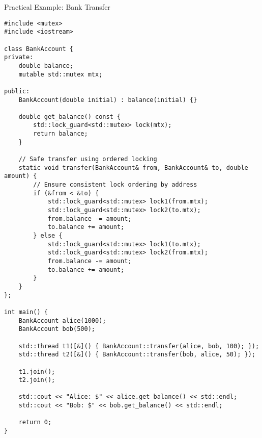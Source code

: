 \begin{frame}[fragile]{ Practical Example: Bank Transfer}
	\begin{verbatim}
#include <mutex>
#include <iostream>

class BankAccount {
private:
    double balance;
    mutable std::mutex mtx;

public:
    BankAccount(double initial) : balance(initial) {}

    double get_balance() const {
        std::lock_guard<std::mutex> lock(mtx);
        return balance;
    }

    // Safe transfer using ordered locking
    static void transfer(BankAccount& from, BankAccount& to, double amount) {
        // Ensure consistent lock ordering by address
        if (&from < &to) {
            std::lock_guard<std::mutex> lock1(from.mtx);
            std::lock_guard<std::mutex> lock2(to.mtx);
            from.balance -= amount;
            to.balance += amount;
        } else {
            std::lock_guard<std::mutex> lock1(to.mtx);
            std::lock_guard<std::mutex> lock2(from.mtx);
            from.balance -= amount;
            to.balance += amount;
        }
    }
};

int main() {
    BankAccount alice(1000);
    BankAccount bob(500);

    std::thread t1([&]() { BankAccount::transfer(alice, bob, 100); });
    std::thread t2([&]() { BankAccount::transfer(bob, alice, 50); });

    t1.join();
    t2.join();

    std::cout << "Alice: $" << alice.get_balance() << std::endl;
    std::cout << "Bob: $" << bob.get_balance() << std::endl;

    return 0;
}
	\end{verbatim}
\end{frame}
